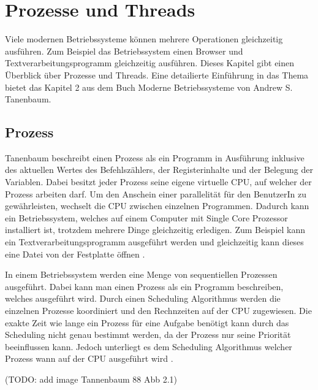 \section{Prozesse und Threads}

Viele modernen Betriebssysteme können mehrere Operationen gleichzeitig ausführen. Zum Beispiel das Betriebssystem einen Browser und Textverarbeitungsprogramm gleichzeitig ausführen. Dieses Kapitel gibt einen Überblick über Prozesse und Threads. Eine detailierte Einführung in das Thema bietet das Kapitel 2 aus dem Buch Moderne Betriebssysteme von Andrew S. Tanenbaum. 


\subsection{Prozess}
\label{section: Prozess}
Tanenbaum beschreibt einen Prozess als ein Programm in Ausführung inklusive des aktuellen Wertes des Befehlszählers, der Registerinhalte und der Belegung der Variablen. Dabei besitzt jeder Prozess seine eigene virtuelle CPU, auf welcher der Prozess arbeiten darf. Um den Anschein einer parallelität für den BenutzerIn zu gewährleisten, wechselt die CPU zwischen einzelnen Programmen. Dadurch kann ein Betriebssystem, welches auf einem Computer mit Single Core Prozessor installiert ist, trotzdem mehrere Dinge gleichzeitig erledigen. Zum Beispiel kann ein Textverarbeitungsprogramm ausgeführt werden und gleichzeitig kann dieses eine Datei von der Festplatte öffnen \cite[p. 87]{tan09}.

In einem Betriebssystem werden eine Menge von sequentiellen Prozessen ausgeführt. Dabei kann man einen Prozess als ein Programm beschreiben, welches ausgeführt wird. Durch einen Scheduling Algorithmus werden die einzelnen Prozesse koordiniert und den Rechnzeiten auf der CPU zugewiesen. Die exakte Zeit wie lange ein Prozess für eine Aufgabe benötigt kann durch das Scheduling nicht genau bestimmt werden, da der Prozess nur seine Priorität beeinflussen kann. Jedoch unterliegt es dem Scheduling Algorithmus welcher Prozess wann auf der CPU ausgeführt wird \cite[p. 88]{tan09}. 

(TODO: add image Tannenbaum 88 Abb 2.1)

